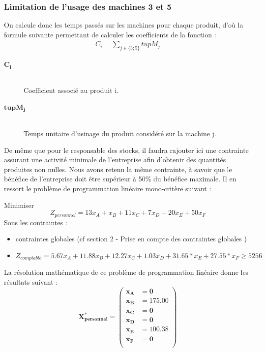 \documentclass[12pt]{article}
\begin{document}
\subsubsection{Limitation de l'usage des machines 3 et 5} 
On calcule donc les temps passés sur les machines pour chaque produit, d'où la formule suivante permettant de calculer les coefficients de la fonction : 
\begin{align*} 
 C_{i} = \sum_{j\in\lbrace3;5\rbrace}tupM_{j} 
 \end{align*} 
\begin{description}
\item[$\boldsymbol{C_{i}}$] \hfill\\Coefficient associé au produit i.
\item[$\boldsymbol{tupM_{j}}$]\hfill\\ Temps unitaire d'usinage du produit considéré sur la machine j.
\end{description}
De même que pour le responsable des stocks, il faudra rajouter ici une contrainte assurant une  activité minimale de l'entreprise afin d'obtenir des quantités produites non nulles. Nous avons retenu la même contrainte, à savoir que le bénéfice de l'entreprise doit être supérieur à 50\% du bénéfice maximale.
Il en ressort le problème de programmation linéaire mono-critère suivant :
\begin{tcolorbox}
Minimiser
\begin{equation*}
 Z_{personnel}= 13x_{A} + x_{B} + 11x_{C} + 7x_{D} + 20x_{E} + 50x_{F}
\end{equation*}
Sous les contraintes :
\begin{itemize}
\item contraintes globales (cf section 2 - Prise en compte des contraintes globales )
\item $ Z_{comptable}= 5.67x_{A} +11.88x_{B} +12.27x_{C} +1.03x_{D} +31.65*x_{E} +27.55*x_{F} \geq 5256$
\end{itemize}
\end{tcolorbox}
La résolution mathématique de ce problème de programmation linéaire donne les résultats suivant :\\
\begin{equation*}
\boldsymbol{X^{*}_{personnel} = 
   \left (
   \begin{aligned}
      x_{A} &= 0 \\
      x_{B} &= 175.00 \\
      x_{C} &= 0 \\
      x_{D} &= 0 \\
      x_{E} &= 100.38 \\ 
      x_{F} &= 0 \\
   \end{aligned}
   \right )
 } 
\end{equation*}
\end{document}
